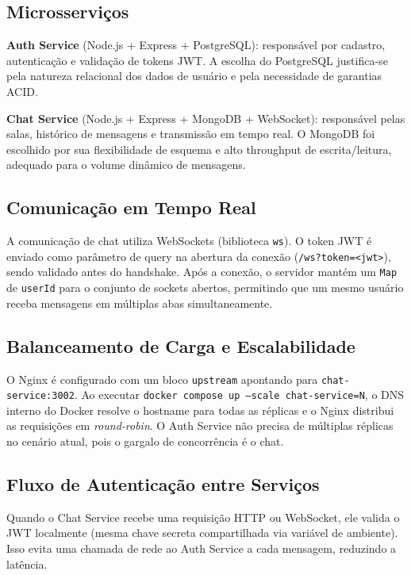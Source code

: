 \documentclass[12pt,a4paper]{article}
\begin{document}
\subsection{Microsserviços}

\textbf{Auth Service} (Node.js + Express + PostgreSQL): responsável por cadastro, autenticação e validação de tokens JWT. A escolha do PostgreSQL justifica-se pela natureza relacional dos dados de usuário e pela necessidade de garantias ACID.

\textbf{Chat Service} (Node.js + Express + MongoDB + WebSocket): responsável pelas salas, histórico de mensagens e transmissão em tempo real. O MongoDB foi escolhido por sua flexibilidade de esquema e alto throughput de escrita/leitura, adequado para o volume dinâmico de mensagens.

\subsection{Comunicação em Tempo Real}

A comunicação de chat utiliza WebSockets (biblioteca \texttt{ws}). O token JWT é enviado como parâmetro de query na abertura da conexão (\texttt{/ws?token=<jwt>}), sendo validado antes do handshake. Após a conexão, o servidor mantém um \texttt{Map} de \texttt{userId} para o conjunto de sockets abertos, permitindo que um mesmo usuário receba mensagens em múltiplas abas simultaneamente.

\subsection{Balanceamento de Carga e Escalabilidade}

O Nginx é configurado com um bloco \texttt{upstream} apontando para \texttt{chat-service:3002}. Ao executar \texttt{docker compose up --scale chat-service=N}, o DNS interno do Docker resolve o hostname para todas as réplicas e o Nginx distribui as requisições em \textit{round-robin}. O Auth Service não precisa de múltiplas réplicas no cenário atual, pois o gargalo de concorrência é o chat.

\subsection{Fluxo de Autenticação entre Serviços}

Quando o Chat Service recebe uma requisição HTTP ou WebSocket, ele valida o JWT localmente (mesma chave secreta compartilhada via variável de ambiente). Isso evita uma chamada de rede ao Auth Service a cada mensagem, reduzindo a latência.
\end{document}

